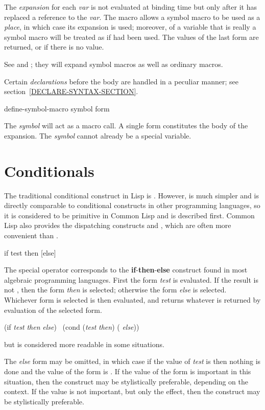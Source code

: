 \begin{defspec}
The \emph{expansion} for each \emph{var} is not evaluated at binding time
but only after it has replaced a reference to the \emph{var}.
The  macro allows a symbol macro to be used as a \emph{place},
in which case its expansion is used; moreover,  of a variable
that is really a symbol macro will be treated as if  had
been used.
The values of the last form are returned, or  if there is no value.

See  and ; they will expand symbol
macros as well as ordinary macros.

Certain \emph{declarations} before the body are handled in a peculiar manner;
see section~\ref{DECLARE-SYNTAX-SECTION}.

\end{defspec}

\begin{defmac}
define-symbol-macro symbol {form}

The \emph{symbol} will act as a macro call. A single form constitutes the body of the
expansion. The \emph{symbol} cannot already be a special variable.
\end{defmac}

\section{Conditionals}

The traditional conditional construct in Lisp is .
However,  is much simpler and is directly comparable
to conditional constructs in other programming languages,
so it is considered to be primitive in Common Lisp and is described first.
Common Lisp also provides the dispatching constructs  and ,
which are often more convenient than .

\begin{defspec}
if test then [else]

The  special operator corresponds to the \textbf{if}-\textbf{then}-\textbf{else} construct
found in most algebraic programming languages.
First the form \emph{test} is evaluated.  If the result is not {\false},
then the form \emph{then} is selected; otherwise the form \emph{else} is selected.
Whichever form is selected is then evaluated, and  returns
whatever is returned by evaluation of the selected form.
\begin{lisp}
(if \emph{test} \emph{then} \emph{else}) \EQ\ (cond (\emph{test} \emph{then}) ({\true} \emph{else}))
\end{lisp}
but  is considered more readable in some situations.

The \emph{else} form may be omitted, in which case if the value of \emph{test}
is {\false} then nothing is done and the value of the  form is {\false}.
If the value of
the  form is important in this situation, then the 
construct may be stylistically preferable,
depending on the context.
If the value is not important, but only the effect, then the 
construct may be stylistically preferable.
\end{defspec}

